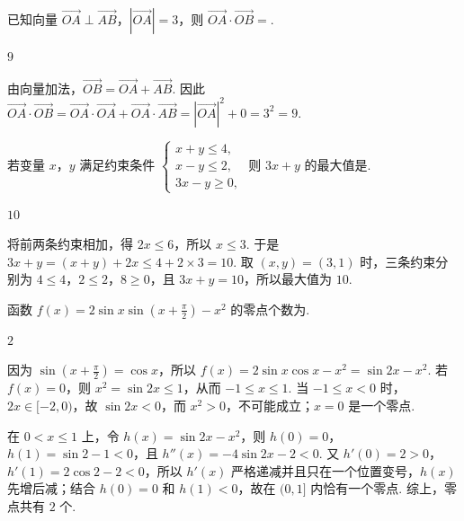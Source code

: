 \begin{problem}
已知向量 \(\overrightarrow{OA}\perp\overrightarrow{AB}\)，\(|\overrightarrow{OA}|=3\)，则 \(\overrightarrow{OA}\cdot\overrightarrow{OB}=\)\fillinblank{}.
\end{problem}

\begin{answer}
\(9\)
\end{answer}

\begin{solution}
由向量加法，\(\overrightarrow{OB}=\overrightarrow{OA}+\overrightarrow{AB}\). 因此 \(\overrightarrow{OA}\cdot\overrightarrow{OB}=\overrightarrow{OA}\cdot\overrightarrow{OA}+\overrightarrow{OA}\cdot\overrightarrow{AB}=|\overrightarrow{OA}|^2+0=3^2=9\).
\end{solution}

\begin{problem}
若变量 \(x\)，\(y\) 满足约束条件 \(\begin{cases}
x+y\leqslant 4,\\
x-y\leqslant 2,\\
3x-y\geqslant 0,
\end{cases}\) 则 \(3x+y\) 的最大值是\fillinblank{}.
\end{problem}

\begin{answer}
\(10\)
\end{answer}

\begin{solution}
将前两条约束相加，得 \(2x\leqslant6\)，所以 \(x\leqslant3\). 于是 \(3x+y=(x+y)+2x\leqslant4+2\times3=10\). 取 \((x,y)=(3,1)\) 时，三条约束分别为 \(4\leqslant4\)，\(2\leqslant2\)，\(8\geqslant0\)，且 \(3x+y=10\)，所以最大值为 \(10\).
\end{solution}

\begin{problem}
函数 \(f(x)=2\sin x\sin\left(x+\frac{\pi}{2}\right)-x^2\) 的零点个数为\fillinblank{}.
\end{problem}

\begin{answer}
\(2\)
\end{answer}

\begin{solution}
因为 \(\sin\left(x+\frac\pi2\right)=\cos x\)，所以 \(f(x)=2\sin x\cos x-x^2=\sin2x-x^2\). 若 \(f(x)=0\)，则 \(x^2=\sin2x\leqslant1\)，从而 \(-1\leqslant x\leqslant1\). 当 \(-1\leqslant x<0\) 时，\(2x\in[-2,0)\)，故 \(\sin2x<0\)，而 \(x^2>0\)，不可能成立；\(x=0\) 是一个零点.

在 \(0<x\leqslant1\) 上，令 \(h(x)=\sin2x-x^2\)，则 \(h(0)=0\)，\(h(1)=\sin2-1<0\)，且 \(h''(x)=-4\sin2x-2<0\). 又 \(h'(0)=2>0\)，\(h'(1)=2\cos2-2<0\)，所以 \(h'(x)\) 严格递减并且只在一个位置变号，\(h(x)\) 先增后减；结合 \(h(0)=0\) 和 \(h(1)<0\)，故在 \((0,1]\) 内恰有一个零点. 综上，零点共有 \(2\) 个.
\end{solution}

